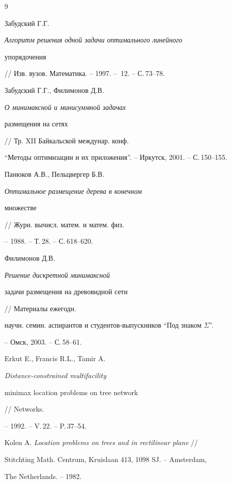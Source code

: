 \begin{thebibliography}{9}







Забудский Г.Г. {\em Алгоритм решения одной задачи оптимального линейного


упорядочения} // Изв. вузов. Математика. -- 1997. -- \No\,12. -- С.\,73--78.




Забудский Г.Г., Филимонов Д.В. {\em О минимаксной и минисуммной задачах


размещения на сетях} // Тр. XII Байкальской междунар. конф. 


``Методы оптимизации и их приложения''. -- Иркутск, 2001. -- С.\,150--155.




Панюков А.В., Пельцвергер Б.В. {\em Оптимальное размещение дерева в конечном


множестве} // Журн. вычисл. матем. и матем. физ.


-- 1988. -- Т.\,28. -- С.\,618--620.




Филимонов Д.В. {\em Решение дискретной минимаксной


задачи размещения на древовидной сети} // Материалы ежегодн. 


научн. семин. аспирантов и студентов-выпускников ``Под знаком $\Sigma$''.


-- Омск, 2003. -- С.\,58--61.




Erkut E., Francis R.L., Tamir A. {\em Distance-constrained multifacility


minimax location problems on tree network} // Networks.


-- 1992. -- V.\,22. -- P.\,37--54.




Kolen A. {\em Location problems on trees and in rectilinear plane} //


Stitchting Math. Centrum, Kruislaan 413, 1098 SJ. -- Amsterdam,


The Netherlands. -- 1982.





\end{thebibliography}





\vskip 2cm











\label{end}






